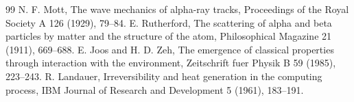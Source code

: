 \documentclass[11pt,a4paper]{article}
\begin{document}
\begin{thebibliography}{99}
 N. F. Mott, The wave mechanics of alpha-ray tracks, Proceedings of the Royal Society A 126 (1929), 79--84.
 E. Rutherford, The scattering of alpha and beta particles by matter and the structure of the atom, Philosophical Magazine 21 (1911), 669--688.
 E. Joos and H. D. Zeh, The emergence of classical properties through interaction with the environment, Zeitschrift fuer Physik B 59 (1985), 223--243.
 R. Landauer, Irreversibility and heat generation in the computing process, IBM Journal of Research and Development 5 (1961), 183--191.
\end{thebibliography}
\end{document}
